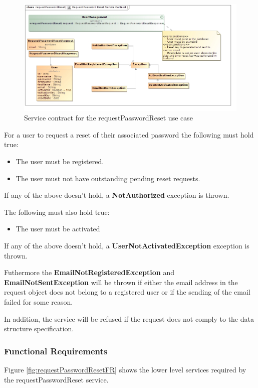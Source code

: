 \begin{figure}[H]
  \begin{center}
  \includegraphics[scale=0.55]{../Diagrams and Charts/Users/Request Password Reset Service Contract.jpg}
  \caption{Service contract for the requestPasswordReset use case}
  \label{fig:requestPasswordResetServicesContract}
  \end{center}  
\end{figure}

For a user to request a reset of their associated password the following must hold true:
\begin{itemize}
	\item The user must be registered.
	\item The user must not have outstanding pending reset requests.
\end{itemize}

If any of the above doesn't hold, a \textbf{NotAuthorized} exception is thrown.

The following must also hold true:
\begin{itemize}
	\item The user must be activated
\end{itemize}

If any of the above doesn't hold, a \textbf{UserNotActivatedException} exception is thrown.

Futhermore the \textbf{EmailNotRegisteredException} and \textbf{EmailNotSentException}
will be thrown if either the email address in the request object does not belong
to a registered user or if the sending of the email failed for some reason.

In addition, the service will be refused if the request does not comply to the data structure specification.

\subsubsection{Functional Requirements}
Figure \ref{fig:requestPasswordResetFR} shows the lower level services required by the requestPasswordReset service.

